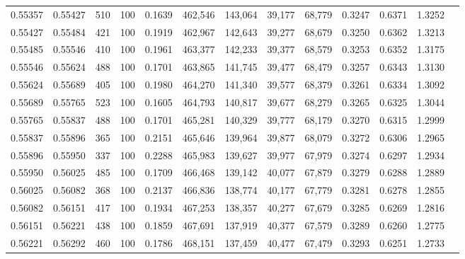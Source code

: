 \begin{tabular}{rrrrrrrrrrrrr}
0.55357 & 0.55427 &   510 & 100 &                                     0.1639 & 462,546 & 143,064 &  39,177 &  68,779 & 0.3247 & 0.6371 & 1.3252 \\
0.55427 & 0.55484 &   421 & 100 &                                     0.1919 & 462,967 & 142,643 &  39,277 &  68,679 & 0.3250 & 0.6362 & 1.3213 \\
0.55485 & 0.55546 &   410 & 100 &                                     0.1961 & 463,377 & 142,233 &  39,377 &  68,579 & 0.3253 & 0.6352 & 1.3175 \\
0.55546 & 0.55624 &   488 & 100 &                                     0.1701 & 463,865 & 141,745 &  39,477 &  68,479 & 0.3257 & 0.6343 & 1.3130 \\
0.55624 & 0.55689 &   405 & 100 &                                     0.1980 & 464,270 & 141,340 &  39,577 &  68,379 & 0.3261 & 0.6334 & 1.3092 \\
0.55689 & 0.55765 &   523 & 100 &                                     0.1605 & 464,793 & 140,817 &  39,677 &  68,279 & 0.3265 & 0.6325 & 1.3044 \\
0.55765 & 0.55837 &   488 & 100 &                                     0.1701 & 465,281 & 140,329 &  39,777 &  68,179 & 0.3270 & 0.6315 & 1.2999 \\
0.55837 & 0.55896 &   365 & 100 &                                     0.2151 & 465,646 & 139,964 &  39,877 &  68,079 & 0.3272 & 0.6306 & 1.2965 \\
0.55896 & 0.55950 &   337 & 100 &                                     0.2288 & 465,983 & 139,627 &  39,977 &  67,979 & 0.3274 & 0.6297 & 1.2934 \\
0.55950 & 0.56025 &   485 & 100 &                                     0.1709 & 466,468 & 139,142 &  40,077 &  67,879 & 0.3279 & 0.6288 & 1.2889 \\
0.56025 & 0.56082 &   368 & 100 &                                     0.2137 & 466,836 & 138,774 &  40,177 &  67,779 & 0.3281 & 0.6278 & 1.2855 \\
0.56082 & 0.56151 &   417 & 100 &                                     0.1934 & 467,253 & 138,357 &  40,277 &  67,679 & 0.3285 & 0.6269 & 1.2816 \\
0.56151 & 0.56221 &   438 & 100 &                                     0.1859 & 467,691 & 137,919 &  40,377 &  67,579 & 0.3289 & 0.6260 & 1.2775 \\
0.56221 & 0.56292 &   460 & 100 &                                     0.1786 & 468,151 & 137,459 &  40,477 &  67,479 & 0.3293 & 0.6251 & 1.2733 \\

\end{tabular}
